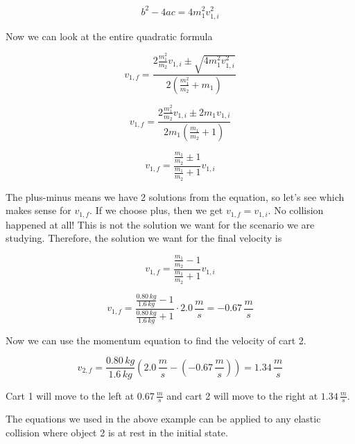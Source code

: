 \documentclass[12pt]{book}
\begin{document}
\begin{exampleblock}
\begin{equation}
b^2 - 4ac = 4 m_1^2 v_{1,i}^2
\end{equation}

Now we can look at the entire quadratic formula

\begin{equation}
v_{1,f} = \frac{2 \frac{m_1^2}{m_2} v_{1,i} \pm \sqrt{4 m_1^2 v_{1,i}^2}}{2 \left( \frac{m_1^2}{m_2} + m_1 \right)}
\end{equation}

\begin{equation}
v_{1,f} = \frac{2 \frac{m_1^2}{m_2} v_{1,i} \pm 2 m_1 v_{1,i}}{2 m_1 \left(\frac{m_1}{m_2} + 1 \right)}
\end{equation}

\begin{equation}
v_{1,f} = \frac{\frac{m_1}{m_2} \pm 1}{\frac{m_1}{m_2} + 1} v_{1,i}
\end{equation}

The plus-minus means we have 2 solutions from the equation, so let's see which makes sense for $v_{1,f}$. If we choose plus, then we get $v_{1,f} = v_{1,i}$. No collision happened at all! This is not the solution we want for the scenario we are studying. Therefore, the solution we want for the final velocity is

\begin{equation}
v_{1,f} = \frac{\frac{m_1}{m_2} - 1}{\frac{m_1}{m_2} + 1} v_{1,i}
\end{equation}

\begin{equation}
v_{1,f} = \frac{\frac{0.80 \, kg}{1.6 \, kg} - 1}{\frac{0.80 \, kg}{1.6 \, kg} + 1} \cdot 2.0 \, \frac{m}{s} = -0.67 \, \frac{m}{s}
\end{equation}

Now we can use the momentum equation to find the velocity of cart 2.

\begin{equation}
v_{2,f} = \frac{0.80 \, kg}{1.6 \, kg} (2.0 \, \frac{m}{s} - (-0.67 \, \frac{m}{s})) = 1.34 \, \frac{m}{s}
\end{equation}

Cart 1 will move to the left at $0.67 \, \frac{m}{s}$ and cart 2 will move to the right at $1.34 \, \frac{m}{s}$.

\end{exampleblock}

The equations we used in the above example can be applied to any elastic collision where object 2 is at rest in the initial state.
\end{document}

